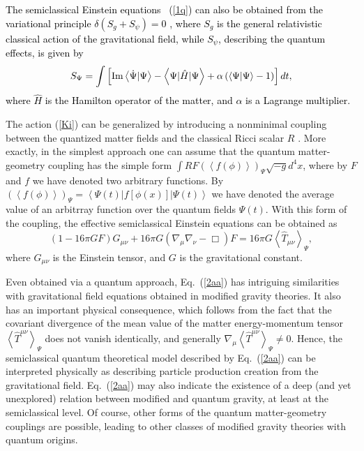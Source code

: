 \documentclass[aps,superscriptaddress, showpacs,preprintnumbers, superscriptaddress, nofootinbibt,twocolumn]{revtex4}
\def\be{\begin{equation}}
\def\ee{\end{equation}}
\newcommand{\te}[1]{\textcolor{black}{#1}}
\begin{document}
\te{ The semiclassical Einstein equations ~(\ref{1q}) can also be obtained from the variational principle
$\delta \left(S_g+S_{\psi}\right)=0$ \cite{sg3a},
where $S_g$ is the general relativistic classical action of the gravitational field, while $S_{\psi}$, describing the quantum effects, is given by
\begin{equation}\label{Ki}
S_{\Psi}=\int{\left[{\rm Im}\left \langle \dot{\Psi}|\Psi\right \rangle-\left \langle \Psi |\hat{H}|\Psi \right \rangle +\alpha \left(\left \langle \Psi |\Psi \right \rangle -1\right) \right]dt},
\end{equation}
where $\hat{H}$ is the Hamilton operator of the matter, and $\alpha $ is a Lagrange multiplier.}

  The action (\ref{Ki}) can be generalized by introducing a nonminimal coupling between the quantized matter fields  and the classical Ricci scalar $R$ \cite{sg3a}. More exactly, in the simplest approach one can assume that the quantum matter-geometry coupling has the simple form
$\int{RF\left(\left<f(\phi)\right>\right)_{\Psi}\sqrt{-g}d^4x}$, where by $F$ and $f$ we have denoted two arbitrary functions. By   $\left(\left<f(\phi)\right>\right)_{\Psi}=\left<\Psi (t)\right|f[\phi (x)]\left|\Psi (t)\right>$ we have denoted the average value of an arbitrray function over the quantum fields $\Psi (t)$. With this form of the coupling, the effective semiclassical Einstein equations can be obtained as \cite{sg3a}
\be\label{2aa}
\left(1-16\pi GF\right)G_{\mu\nu}+16\pi G\left(\nabla _{\mu }\nabla _{\nu}-\Box\right)F=16\pi G \left< \hat{T}_{\mu \nu}\right> _{\Psi},
\ee
where $G_{\mu \nu}$ is the Einstein tensor, and $G$ is the gravitational constant.  

Even obtained via a quantum approach, Eq.~(\ref{2aa}) has intriguing similarities with gravitational field equations obtained in modified gravity theories. It also has an important physical consequence, which follows from the fact that the covariant divergence of the  mean value of the matter energy-momentum tensor $\left< \hat{T}^{\mu \nu}\right> _{\Psi}$ does not vanish identically, and generally $\nabla _{\mu}\left< \hat{T}^{\mu \nu}\right> _{\Psi}\neq 0$. Hence, the semiclassical quantum theoretical model described by Eq.~(\ref{2aa}) can be interpreted physically as describing particle production creation from the gravitational field. Eq.~(\ref{2aa}) may also indicate the existence of a deep (and yet unexplored) relation between modified and quantum  gravity, at least at the semiclassical level. Of course, other forms of the quantum matter-geometry couplings are possible, leading to other classes of modified gravity theories with quantum origins.
\end{document}
